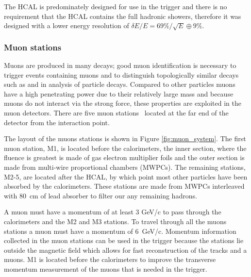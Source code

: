 The HCAL is predominately designed for use in the trigger and there is no requirement that the HCAL contains the full hadronic showers, therefore it was designed with a lower energy resolution of $\delta E / E = 69\% / \sqrt{E} \oplus 9\%$. 


\subsubsection{Muon stations}
\label{Muon_stations}

Muons are produced in many \bhadron decays; good muon identification is necessary to trigger events containing muons and to distinguish topologically similar decays such as \bmumu and \bdkpi in analysis of particle decays. 
Compared to other particles muons have a high penetrating power due to their relatively large mass and because muons do not interact via the strong force, these properties are exploited in the muon detectors. There are five muon stations~\cite{Barbosa-Marinho:504326} located at the far end of the detector from the interaction point. %


The layout of the muons stations is shown in Figure \ref{fig:muon_system}. 
The first muon station, M1,  is located before the calorimeters, the inner section, where the fluence is greatest is made of gas electron multiplier foils and the outer section is made from multi-wire proportional chambers (MWPCs). The remaining stations, M2-5, are located after the HCAL, by which point most other particles have been absorbed by the calorimeters. These stations are made from MWPCs interleaved with 80~cm of lead absorber to filter our any remaining hadrons. %



A muon must have a momentum of at least 3 GeV/c to pass through the calorimeters and the M2 and M3 stations. To travel through all the muons stations a muon must have a momentum of 6~GeV/c. 
Momentum information collected in the muon stations can be used in the trigger because the stations lie outside the magnetic field which allows for fast reconstruction of the tracks and a muons. M1 is located before the calorimeters to improve the transverse momentum measurement of the muons that is needed in the trigger.

